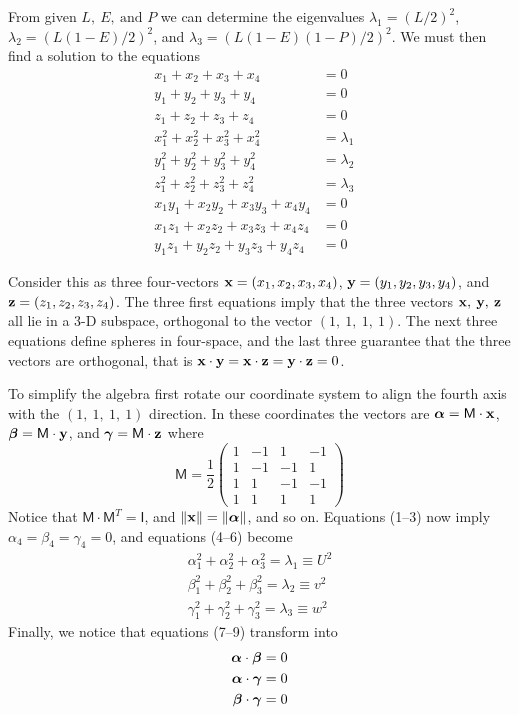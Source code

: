 \documentclass[12pt] {article}
\def\bal{{\ifmmode \boldsymbol{\alpha} \else $\boldsymbol{\alpha}$\fi}}
\def\bbe{{\ifmmode \boldsymbol{\beta } \else $\boldsymbol{\beta }$\fi}}
\def\bga{{\ifmmode \boldsymbol{\gamma} \else
   $\boldsymbol{\gamma}$\fi}}
\begin{document}
From given $L,\>E,\>\text{and\ } P$ we can determine the eigenvalues
  $\lambda_1 = (L/2)^2$, $\lambda_2 = (L(1-E)/2)^2$, and
  $\lambda_3 = (L(1-E)(1-P)/2)^2$. We must then find a solution to
  the equations
\begin{align}
x_1 + x_2 + x_3 + x_4 &= 0& \\
y_1 + y_2 + y_3 + y_4 &= 0& \\
z_1 + z_2 + z_3 + z_4 &= 0& \\
x_1^2 + x_2^2 + x_3^2 + x_4^2 &= \lambda_1 &\\
y_1^2 + y_2^2 + y_3^2 + y_4^2 &= \lambda_2 &\\
z_1^2 + z_2^2 + z_3^2 + z_4^2 &= \lambda_3 &\\
x_1 y_1 + x_2 y_2 + x_3 y_3 + x_4 y_4 &= 0 &\\
x_1 z_1 + x_2 z_2 + x_3 z_3 + x_4 z_4 &= 0 &\\
y_1 z_1 + y_2 z_2 + y_3 z_3 + y_4 z_4 &= 0 &
\end{align}

Consider this as three four-vectors ${\bf x}= (x_1, x_2, x_3, x_4)$,
${\bf y}= (y_1, y_2, y_3, y_4)$, and ${\bf z}= (z_1, z_2, z_3, z_4)$.
The three first equations imply that the three vectors ${\bf x, \>y,
  \>z}$ all lie in a 3-D subspace, orthogonal to the vector
$(1,\>1,\>1,\>1)$. The next three equations define spheres in
four-space, and the last three guarantee that the three vectors are
orthogonal, that is ${\bf x\cdot y = x\cdot z = y \cdot z} = 0$.

To simplify the algebra first rotate our coordinate system to align
the fourth axis with the $(1,\>1,\>1,\>1)$ direction. In these
coordinates the vectors are $\bal = \mathsf{M}\cdot{\bf x}$, $\bbe =
\mathsf{M}\cdot{\bf y}$, and $\bga = \mathsf{M}\cdot{\bf z}$ where
\begin{equation}
\mathsf{M} = \frac{1}{2} \left(\begin{array}{crrr}
1 & -1 & 1 & -1 \\
1 & -1 &-1 &  1 \\
1 &  1 &-1 & -1 \\
1 &  1 & 1 &  1
\end{array}\right)
\end{equation}
Notice that $\mathsf{M}\cdot\mathsf{M}^T = \mathsf{I}$, and $\|{\bf x}\| =
\|\bal\|$, and so on. Equations (1--3) now imply $\alpha_4 =
\beta_4 = \gamma_4 = 0$, and equations (4--6) become
\begin{eqnarray}
\alpha_1^2 + \alpha_2^2 + \alpha_3^2 = \lambda_1 \equiv U^2 \\
\beta_1^2  + \beta_2^2  + \beta_3^2  = \lambda_2 \equiv v^2 \\
\gamma^2_1 + \gamma^2_2 + \gamma^2_3 = \lambda_3 \equiv w^2
\end{eqnarray}
Finally, we notice that equations (7--9) transform into 
\begin{eqnarray}
\bal\cdot \bbe  = 0\\
\bal\cdot \bga = 0\\
\bbe\cdot \bga  = 0
\end{eqnarray}
\end{document}
